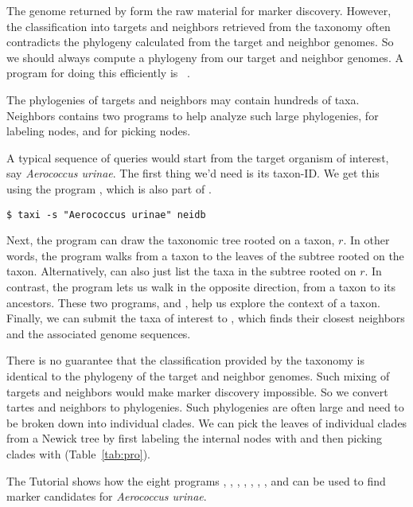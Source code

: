 The genome returned by  form the raw material for marker
discovery. However, the classification into targets and neighbors
retrieved from the taxonomy often contradicts the phylogeny calculated
from the target and neighbor genomes. So we should always compute a
phylogeny from our target and neighbor genomes. A program for doing
this efficiently is ~\cite{klo20:phy}.

The phylogenies of targets and neighbors may contain hundreds of
taxa. Neighbors contains two programs to help analyze such large
phylogenies,  for labeling nodes, and  for picking
nodes.






A typical sequence
of queries would start from the target organism of interest,
say \emph{Aerococcus urinae}. The first thing we'd need is its
taxon-ID. We get this using the program , which is also part
of .
\begin{verbatim}
$ taxi -s "Aerococcus urinae" neidb
\end{verbatim}
Next, the program  can draw the taxonomic tree rooted on a
taxon, $r$. In other words, the program  walks from a taxon
to the leaves of the subtree rooted on the
taxon. Alternatively,  can also just list the taxa in the
subtree rooted on $r$. In contrast, the program  lets us walk
in the opposite direction, from a taxon to its ancestors. These two
programs,  and , help us explore the context of a
taxon. Finally, we can submit the taxa of interest to ,
which finds their closest neighbors and the associated genome
sequences.

There is no guarantee that the classification provided by the taxonomy
is identical to the phylogeny of the target and neighbor genomes. Such
mixing of targets and neighbors would make marker discovery
impossible. So we convert tartes and neighbors to phylogenies. Such
phylogenies are often large and need to be broken down into individual
clades. We can pick the leaves of individual clades from a Newick tree
by first labeling the internal nodes with  and then picking
clades with  (Table~\ref{tab:pro}).

The Tutorial shows how the eight
programs , , , ,
, , , and  can be used
to find marker candidates for \emph{Aerococcus urinae}.
